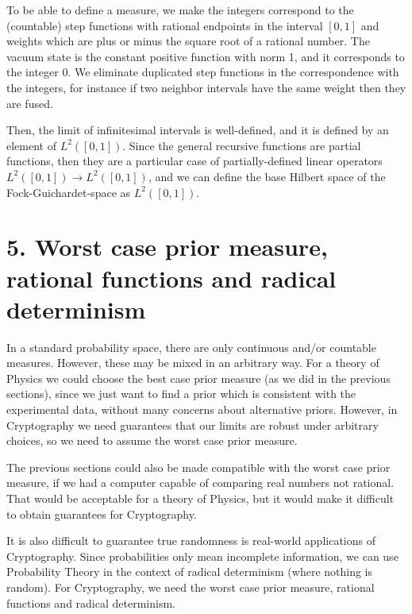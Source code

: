 \documentclass[11pt]{book}
\begin{document}
To be able to define a measure, we make the integers correspond to the
(countable) step functions with rational endpoints in the interval
\([0,1]\) and weights which are plus or minus the square root of a
rational number\cite{book91891579}. The vacuum state is the constant positive function
with norm 1, and it corresponds to the integer \(0\). We eliminate
duplicated step functions in the correspondence with the integers, for
instance if two neighbor intervals have the same weight then they are
fused.

Then, the limit of infinitesimal intervals is well-defined, and it is
defined by an element of \(L^2([0,1])\). Since the general recursive
functions are partial functions, then they are a particular case of
partially-defined linear operators \(L^2([0,1])\to L^2([0,1])\), and we
can define the base Hilbert space of the Fock-Guichardet-space as
\(L^2([0,1])\).

\hypertarget{worst-case-prior-measure-rational-functions-and-radical-determinism}{%
\section{5. Worst case prior measure, rational functions and radical
determinism}\label{worst-case-prior-measure-rational-functions-and-radical-determinism}}

In a standard probability space, there are only continuous and/or
countable measures. However, these may be mixed in an arbitrary way. For
a theory of Physics we could choose the best case prior measure (as we
did in the previous sections), since we just want to find a prior which
is consistent with the experimental data, without many concerns about
alternative priors. However, in Cryptography we need guarantees that our
limits are robust under arbitrary choices, so we need to assume the
worst case prior measure.

The previous sections could also be made compatible with the worst case
prior measure, if we had a computer capable of comparing real numbers
not rational. That would be acceptable for a theory of Physics, but it
would make it difficult to obtain guarantees for Cryptography.

It is also difficult to guarantee true randomness is real-world
applications of Cryptography. Since probabilities only mean incomplete
information, we can use Probability Theory in the context of radical
determinism (where nothing is random). For Cryptography, we need the
worst case prior measure, rational functions and radical determinism.
\end{document}
